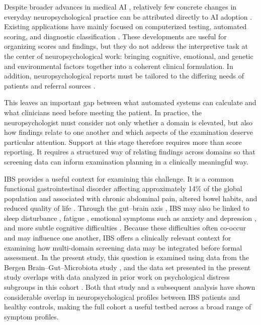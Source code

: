 \documentclass[11pt,a4paper]{article}
\begin{document}
Despite broader advances in medical AI \citep{Thirunavukarasu2023, Meskó2023}, relatively few concrete changes in everyday neuropsychological practice can be attributed directly to AI adoption \citep{DeRightPuente2026}. Existing applications have mainly focused on computerized testing, automated scoring, and diagnostic classification \citep{Parsons2018Tech, Andersen2026ROCF}. 
These developments are useful for organizing scores and findings, but they do not address the interpretive task at the center of neuropsychological work: 
bringing cognitive, emotional, and genetic and environmental factors together into a coherent clinical formulation. In addition, neuropsychological reports must be tailored to the differing needs of patients and referral sources \citep{Postal2018ReportWriting}.

This leaves an important gap between what automated systems can calculate and what clinicians need before meeting the patient. In practice, the neuropsychologist must consider not only whether a domain is elevated, but also how findings relate to one another and which aspects of the examination deserve particular attention. Support at this stage therefore requires more than score reporting. It requires a structured way of relating findings across domains so that screening data can inform examination planning in a clinically meaningful way.

IBS provides a useful context for examining this challenge. It is a common functional gastrointestinal disorder affecting approximately 14\% of the global population and associated with chronic abdominal pain, altered bowel habits, and reduced quality of life \citep{Arif2025IBS}. Through the gut--brain axis \citep{Mayer2015, Cryan2019}, IBS may also be linked to sleep disturbance \citep{Tu2017}, fatigue \citep{Han2016}, emotional symptoms such as anxiety and depression  \citep{staudacher2023irritable}, %
and more subtle cognitive difficulties \citep{lam2019cognitive, Billing2024}. %
Because these difficulties often co-occur and may influence one another, IBS offers a clinically relevant context for examining how multi-domain screening data may be integrated before formal assessment. In the present study, this question is examined using data from the Bergen Brain--Gut--Microbiota study \citep{Berentsen2020}, and the data set presented in the present study overlaps with data analyzed in prior work on psychological distress subgroups in this cohort \citep{LundervoldAJ2024}. Both that study and a subsequent analysis \citep{LundervoldA2026} have shown considerable overlap in neuropsychological profiles between IBS patients and healthy controls, making the full cohort a useful testbed across a broad range of symptom profiles.
\end{document}

